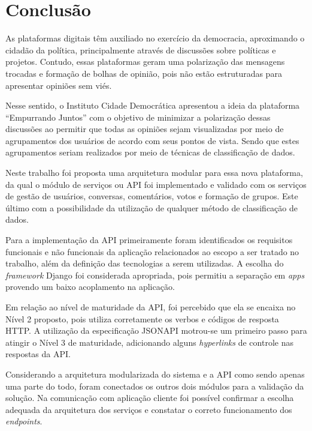 \chapter{Conclusão} \label{cap:consideracoes_finais}

  As plataformas digitais têm auxiliado no exercício da democracia, aproximando o cidadão da política, principalmente
  através de discussões sobre políticas e projetos. Contudo,
  essas plataformas geram uma polarização das mensagens trocadas e formação de bolhas de opinião, 
  pois não estão estruturadas para apresentar opiniões sem viés.
  
  Nesse sentido, o Instituto Cidade Democrática apresentou a ideia da plataforma ``Empurrando Juntos'' com o objetivo
  de minimizar a polarização dessas discussões ao permitir que todas as opiniões sejam visualizadas por meio de agrupamentos
  dos usuários de acordo com seus pontos de vista. Sendo que estes agrupamentos seriam realizados por meio de técnicas 
  de classificação de dados.

  Neste trabalho foi proposta uma arquitetura modular para essa nova plataforma, da qual o módulo de serviços ou API
  foi implementado e validado com os serviços de gestão de usuários, 
  conversas, comentários, votos e formação de grupos. Este último com a possibilidade da utilização de qualquer método 
  de classificação de dados.
  
  Para a implementação da API primeiramente foram identificados os requisitos funcionais e não funcionais da aplicação
  relacionados ao escopo a ser tratado no trabalho, além
  da definição das tecnologias a serem utilizadas. A escolha do \textit{framework} Django foi considerada apropriada, pois permitiu
  a separação em \textit{apps} provendo um baixo acoplamento na aplicação. 
  
  Em relação ao nível de maturidade da API, foi percebido que ela se encaixa no Nível 2 proposto,
  pois utiliza corretamente os verbos e códigos de resposta HTTP.
  A utilização da especificação JSONAPI motrou-se um primeiro passo para atingir o Nível 3 de maturidade,
  adicionando alguns \textit{hyperlinks} de controle nas respostas da API.
  
  Considerando a arquitetura modularizada do sistema e a API como sendo apenas uma parte do todo, 
  foram conectados os outros dois módulos para a validação 
  da solução. Na comunicação com aplicação cliente foi possível confirmar a escolha adequada da arquitetura dos serviços e 
  constatar o correto funcionamento dos \textit{endpoints}.
  
